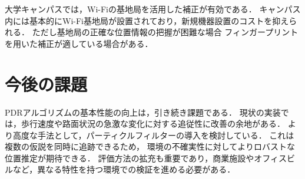 \documentclass[a4paper, 10pt, twocolumn]{jarticle}
\begin{document}
大学キャンパスでは，Wi-Fiの基地局を活用した補正が有効である．
キャンパス内には基本的にWi-Fi基地局が設置されており，新規機器設置のコストを抑えられる．
ただし基地局の正確な位置情報の把握が困難な場合
フィンガープリントを用いた補正が適している場合がある．



\section{今後の課題}
PDRアルゴリズムの基本性能の向上は，引き続き課題である．
現状の実装では，歩行速度や路面状況の急激な変化に対する追従性に改善の余地がある．
より高度な手法として，パーティクルフィルターの導入を検討している．
これは複数の仮説を同時に追跡できるため，
環境の不確実性に対してよりロバストな位置推定が期待できる．
評価方法の拡充も重要であり，商業施設やオフィスビルなど，異なる特性を持つ環境での検証を進める必要がある．




\end{document}
